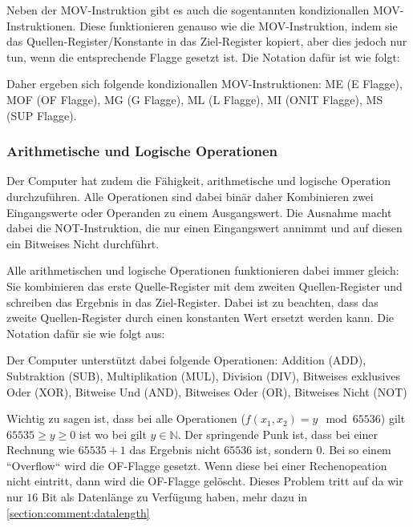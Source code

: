 \documentclass{scrartcl}
\begin{document}
Neben der MOV-Instruktion gibt es auch die sogentannten kondizionallen MOV-Instruktionen. Diese funktionieren genauso wie die MOV-Instruktion, indem sie das Quellen-Register/Konstante in das Ziel-Register kopiert, aber dies jedoch nur tun, wenn die entsprechende Flagge gesetzt ist. Die Notation dafür ist wie folgt:


Daher ergeben sich folgende kondizionallen MOV-Instruktionen: ME (E Flagge), MOF (OF Flagge), MG (G Flagge), ML (L Flagge), MI (ONIT Flagge), MS (SUP Flagge).



\subsubsection{\label{section:arthimatik}Arithmetische und Logische Operationen}

Der Computer hat zudem die Fähigkeit, arithmetische und logische Operation durchzuführen. Alle Operationen sind dabei binär daher Kombinieren zwei Eingangswerte oder Operanden zu einem Ausgangswert. Die Ausnahme macht dabei die NOT-Instruktion, die nur einen Eingangswert annimmt und auf diesen ein Bitweises Nicht durchführt. 

Alle arithmetischen und logische Operationen funktionieren dabei immer gleich: Sie kombinieren das erste Quelle-Register mit dem zweiten Quellen-Register und schreiben das Ergebnis in das Ziel-Register. Dabei ist zu beachten, dass das zweite Quellen-Register durch einen konstanten Wert ersetzt werden kann. Die Notation dafür sie wie folgt aus:


Der Computer unterstützt dabei folgende Operationen: Addition (ADD), Subtraktion (SUB), Multiplikation (MUL), Division (DIV), Bitweises exklusives Oder (XOR), Bitweise Und (AND), Bitweises Oder (OR), Bitweises Nicht (NOT)



Wichtig zu sagen ist, dass bei alle Operationen ($f(x_1, x_2) = y \mod 65536$) gilt $65535 \ge y \ge 0$ ist wo bei gilt $y \in \mathbb{N}$. Der springende Punk ist, dass bei einer Rechnung wie $65535 + 1$ das Ergebnis nicht $65536$ ist, sondern $0$. Bei so einem “Overflow“ wird die OF-Flagge gesetzt. Wenn diese bei einer Rechenopeation nicht eintritt, dann wird die OF-Flagge gelöscht. Dieses Problem tritt auf da wir nur $16$ Bit als Datenlänge zu Verfügung haben, mehr dazu in \autoref{section:comment:datalength}
\end{document}

